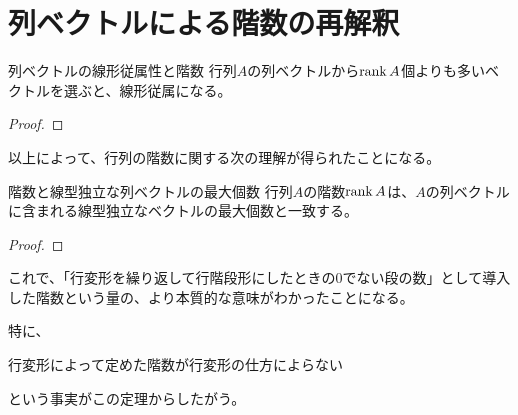 \documentclass[../../../topic_linear-algebra]{subfiles}
\begin{document}
\sectionline
\section{列ベクトルによる階数の再解釈}

\begin{theorem}{列ベクトルの線形従属性と階数}
  行列$A$の列ベクトルから$\rank A$個よりも多いベクトルを選ぶと、線形従属になる。
\end{theorem}

\begin{proof}
\end{proof}

\br

以上によって、行列の階数に関する次の理解が得られたことになる。

\begin{theorem}{階数と線型独立な列ベクトルの最大個数}\label{thm:rank-equals-max-indep-cols}
  行列$A$の階数$\rank A$は、$A$の列ベクトルに含まれる線型独立なベクトルの最大個数と一致する。
\end{theorem}

\begin{proof}
\end{proof}

\br

これで、「行変形を繰り返して行階段形にしたときの0でない段の数」として導入した階数という量の、より本質的な意味がわかったことになる。

\br

特に、
\begin{emphabox}
  \begin{spacebox}
    \begin{center}
      行変形によって定めた階数が行変形の仕方によらない
    \end{center}
  \end{spacebox}
\end{emphabox}
という事実がこの定理からしたがう。
\end{document}
